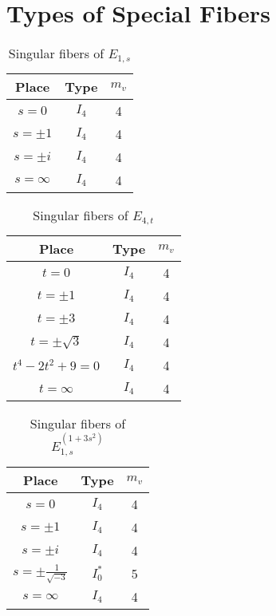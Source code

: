 \documentclass[main]{subfiles}
\begin{document}
\chapter{Types of Special Fibers}
\begin{table}[h]
    \centering
    \caption{Singular fibers of $E_{1,s}$}
    \begin{tabular}{|c|c|c|}
        \hline
        Place      & Type  & $m_v$ \\
        \hline
        $s=0$      & $I_4$ & 4     \\
        $s=\pm 1$  & $I_4$ & 4     \\
        $s=\pm i$  & $I_4$ & 4     \\
        $s=\infty$ & $I_4$ & 4     \\
        \hline
    \end{tabular}
\end{table}

\begin{table}[h]
    \centering
    \caption{Singular fibers of $E_{4,t}$}
    \begin{tabular}{|c|c|c|}
        \hline
        Place            & Type  & $m_v$ \\
        \hline
        $t=0$            & $I_4$ & 4     \\
        $t=\pm 1$        & $I_4$ & 4     \\
        $t=\pm 3$        & $I_4$ & 4     \\
        $t=\pm \sqrt{3}$ & $I_4$ & 4     \\
        $t^4-2t^2+9=0$   & $I_4$ & 4     \\
        $t=\infty$       & $I_4$ & 4     \\
        \hline
    \end{tabular}
\end{table}

\begin{table}[h]
    \centering
    \caption{Singular fibers of $E_{1,s}^{(1 + 3s^{2})}$}
    \begin{tabular}{|c|c|c|}
        \hline
        Place                        & Type    & $m_v$ \\
        \hline
        $s=0$                        & $I_4$   & 4     \\
        $s=\pm 1$                    & $I_4$   & 4     \\
        $s=\pm i$                    & $I_4$   & 4     \\
        $s=\pm \frac{1}{\sqrt{-3}} $ & $I_0^*$ & 5     \\
        $s=\infty$                   & $I_4$   & 4     \\
        \hline
    \end{tabular}
\end{table}
\end{document}
